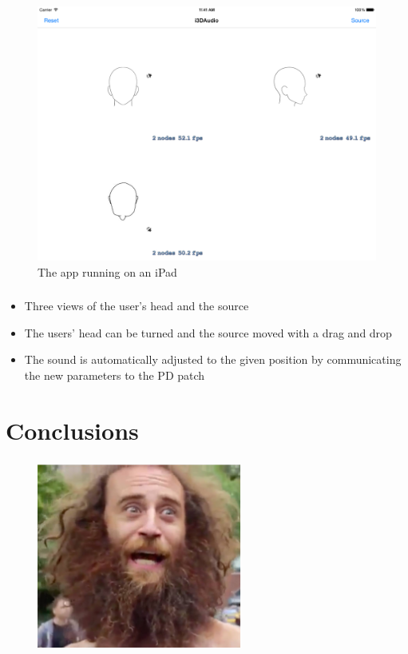 \documentclass{beamer}
\begin{document}
	\begin{frame}
		\frametitle{\insertsection}
		\begin{figure}
			\centering
			\includegraphics[width=1.0\textheight]{images/iOS_screenshot_0.png}
			\caption{The app running on an iPad}
			\label{fig:ios_app}
		\end{figure}
	\end{frame}

	\begin{frame}
		\frametitle{\insertsection}
		\begin{itemize}
			\item Three views of the user's head and the source
			\item The users' head can be turned and the source moved with a drag and drop
			\item The sound is automatically adjusted to the given position by communicating the
				new parameters to the PD patch
		\end{itemize}
	\end{frame}

	\section{Conclusions}

	\begin{frame}
		\frametitle{\insertsection}
		\begin{figure}
			\centering
			\includegraphics[width=0.6\textwidth]{images/alas.jpg}
		\end{figure}
	\end{frame}
\end{document}
